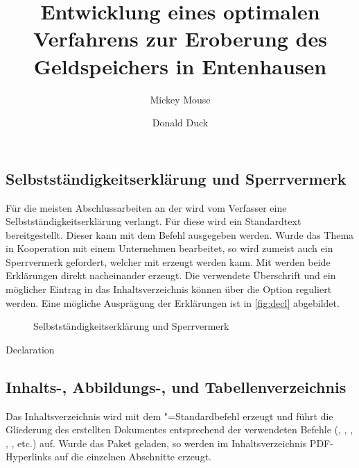 \documentclass[%
  english,ngerman,%
  cdgeometry=no,DIV=12,automark,%
]{tudscrartcl}
\begin{document}
\subsection{Selbstständigkeitserklärung und Sperrvermerk}
Für die meisten Abschlussarbeiten an der \TnUD wird vom Verfasser eine 
Selbstständigkeitserklärung verlangt. Für diese wird ein Standardtext 
bereitgestellt. Dieser kann mit dem Befehl  ausgegeben 
werden. Wurde das Thema in Kooperation mit einem Unternehmen bearbeitet, so 
wird zumeist auch ein Sperrvermerk gefordert, welcher mit  
erzeugt werden kann. Mit  werden beide Erklärungen direkt 
nacheinander erzeugt. Die verwendete Überschrift und ein möglicher Eintrag in 
das Inhaltsverzeichnis können über die Option  reguliert 
werden. Eine mögliche Ausprägung der Erklärungen ist in \autoref{fig:decl} 
abgebildet.
%
\begin{figure}
\centering
{}
\caption{Selbstständigkeitserklärung und Sperrvermerk}
\label{fig:decl}
\end{figure}

\begin{Hint!}{Declaration}
\title{%
  Entwicklung eines optimalen Verfahrens zur Eroberung des
  Geldspeichers in Entenhausen
}
\author{Mickey Mouse\and Donald Duck}
\declaration[company=FIRMA]
\end{Hint!}
\begin{Trunk+}
\declaration[company=FIRMA]

\end{Trunk+}

\subsection{Inhalts-, Abbildungs-, und Tabellenverzeichnis}
Das Inhaltsverzeichnis wird mit dem "=Standardbefehl 
 erzeugt und führt die Gliederung des erstellten 
Dokumentes entsprechend der verwendeten Befehle (, , 
, , ,  etc.) auf. 
Wurde das Paket  geladen, so werden im Inhaltsverzeichnis 
PDF-Hyperlinks auf die einzelnen Abschnitte erzeugt.
\end{document}
